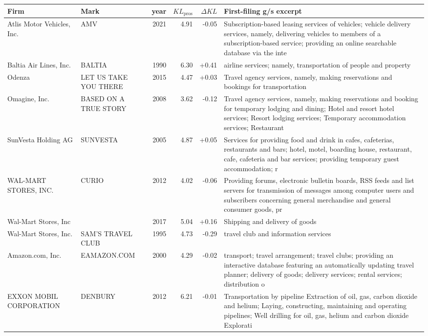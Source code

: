 \begin{tabular}{p{4.0cm}p{2.2cm}rrrp{6.5cm}}
\toprule
Firm & Mark & year & $KL_\text{pros}$ & $\Delta KL$ & First-filing g/s excerpt \\
\midrule
Atlis Motor Vehicles, Inc. & AMV & 2021 & 4.91 & -0.05 & Subscription-based leasing services of vehicles; vehicle delivery services, namely, delivering vehicles to members of a subscription-based service; providing an online searchable database via the inte \\
Baltia Air Lines, Inc. & BALTIA & 1990 & 6.30 & +0.41 & airline services; namely, transportation of people and property \\
Odenza & LET US TAKE YOU THERE & 2015 & 4.47 & +0.03 & Travel agency services, namely, making reservations and bookings for transportation \\
Omagine, Inc. & BASED ON A TRUE STORY & 2008 & 3.62 & -0.12 & Travel agency services, namely, making reservations and booking for temporary lodging and dining; Hotel and resort hotel services; Resort lodging services; Temporary accommodation services; Restaurant \\
SunVesta Holding AG & SUNVESTA & 2005 & 4.87 & +0.05 & Services for providing food and drink in cafes, cafeterias, restaurants and bars; hotel, motel, boarding house, restaurant, cafe, cafeteria and bar services; providing temporary guest accommodation; r \\
WAL-MART STORES, INC. & CURIO & 2012 & 4.02 & -0.06 & Providing forums, electronic bulletin boards, RSS feeds and list servers for transmission of messages among computer users and subscribers concerning general merchandise and general consumer goods, pr \\
Wal-Mart Stores, Inc &  & 2017 & 5.04 & +0.16 & Shipping and delivery of goods \\
Wal-Mart Stores, Inc. & SAM'S TRAVEL CLUB & 1995 & 4.73 & -0.29 & travel club and information services \\
Amazon.com, Inc. & EAMAZON.COM & 2000 & 4.29 & -0.02 & transport; travel arrangement; travel clubs; providing an interactive database featuring an automatically updating travel planner; delivery of goods; delivery services; rental services; distribution o \\
EXXON MOBIL CORPORATION & DENBURY & 2012 & 6.21 & -0.01 & Transportation by pipeline Extraction of oil, gas, carbon dioxide and helium; Laying, constructing, maintaining and operating pipelines; Well drilling for oil, gas, helium and carbon dioxide Explorati \\
\bottomrule
\end{tabular}
\clearpage

